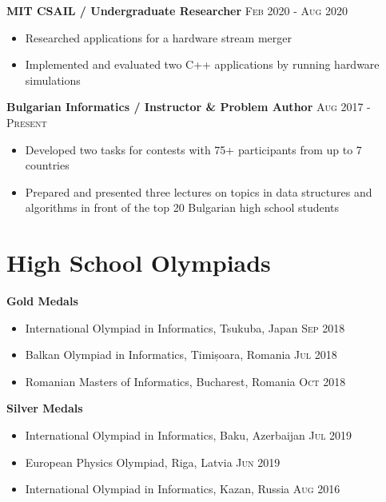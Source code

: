 \documentclass[letterpaper,11pt]{article}
\newcommand{\noskip}{\vspace{-\parskip}}
\newcommand{\doskip}{\vspace{\parskip}}
\begin{document}
\textbf{MIT CSAIL / Undergraduate Researcher}
\hfill
\textsc{Feb 2020 - Aug 2020}
\noskip
\begin{itemize}
    \item Researched applications for a hardware stream merger
    \item Implemented and evaluated two C++ applications by running hardware
        simulations
\end{itemize}

\textbf{Bulgarian Informatics / Instructor \& Problem Author}
\hfill
\textsc{Aug 2017 - Present}
\noskip
\begin{itemize}
    \item Developed two tasks for contests with 75+ participants from up to 7
        countries
    \item Prepared and presented three lectures on topics in data structures and
        algorithms in front of the top 20 Bulgarian high school students
\end{itemize}

\section*{High School Olympiads}
\textbf{Gold Medals}
\noskip
\begin{itemize}
    \item International Olympiad in Informatics, Tsukuba, Japan
        \hfill \textsc{Sep 2018}
    \item Balkan Olympiad in Informatics, Timișoara, Romania
        \hfill \textsc{Jul 2018}
    \item Romanian Masters of Informatics, Bucharest, Romania
        \hfill \textsc{Oct 2018}
\end{itemize}

\textbf{Silver Medals}
\noskip
\begin{itemize}
    \item International Olympiad in Informatics, Baku, Azerbaijan
        \hfill \textsc{Jul 2019}
    \item European Physics Olympiad, Riga, Latvia
        \hfill \textsc{Jun 2019}
    \item International Olympiad in Informatics, Kazan, Russia
        \hfill \textsc{Aug 2016}
\end{itemize}
\end{document}
